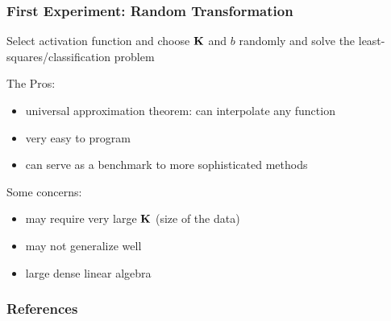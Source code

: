 \documentclass[12pt,fleqn,handout]{beamer}
\begin{document}
\begin{frame}[fragile]\frametitle{First Experiment: Random Transformation}

Select activation function and choose ${\bf K}$ and $b$ randomly and solve the least-squares/classification problem

\bigskip

The Pros:
\begin{itemize}
\item universal approximation theorem: can interpolate any function
\item very easy to program
\item can serve as a benchmark to more sophisticated methods
\end{itemize}

\bigskip

Some concerns:
\begin{itemize}
\item may require very large ${\bf K}$ (size of the data)
\item may not generalize well
\item large dense linear algebra
\end{itemize}

\end{frame}


\begin{frame}[allowframebreaks]
	\frametitle{References}


\end{frame}
\end{document}

